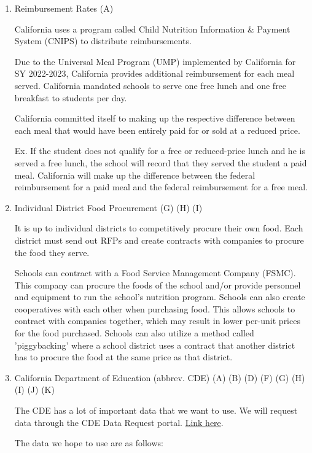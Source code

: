 \documentclass[12pt]{article}
\begin{document}
\begin{enumerate}
	
	\item Reimbursement Rates (A)
	
	California uses a program called Child Nutrition Information \& Payment System (CNIPS) to distribute reimbursements. 
	
	Due to the Universal Meal Program (UMP) implemented by California for SY 2022-2023, California provides additional reimbursement for each meal served. California mandated schools to serve one free lunch and one free breakfast to students per day. 
	
	California committed itself to making up the respective difference between each meal that would have been entirely paid for or sold at a reduced price.
	
	Ex. If the student does not qualify for a free or reduced-price lunch and he is served a free lunch, the school will record that they served the student a paid meal. California will make up the difference between the federal reimbursement for a paid meal and the federal reimbursement for a free meal.
	
	\item Individual District Food Procurement (G) (H) (I)
	
	It is up to individual districts to competitively procure their own food. Each district must send out RFPs and create contracts with companies to procure the food they serve.
	
	Schools can contract with a Food Service Management Company (FSMC). This company can procure the foods of the school and/or provide personnel and equipment to run the school's nutrition program. Schools can also create cooperatives with each other when purchasing food. This allows schools to contract with companies together, which may result in lower per-unit prices for the food purchased. Schools can also utilize a method called 'piggybacking' where a school district uses a contract that another district has to procure the food at the same price as that district.  
	
	\item California Department of Education (abbrev. CDE) (A) (B) (D) (F) (G) (H) (I) (J) (K)
	
	The CDE has a lot of important data that we want to use. We will request data through the CDE Data Request portal. \href{https://www.cde.ca.gov/ds/da/}{Link here}.
	
	The data we hope to use are as follows:
	

\end{enumerate}
\end{document}
